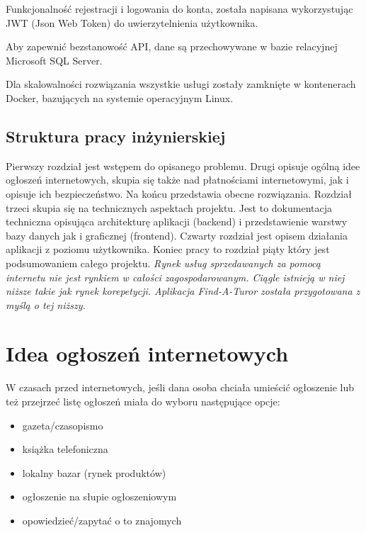 \documentclass[12pt]{article}
\numberwithin{figure}{section}
\begin{document}
Funkcjonalność rejestracji i logowania do konta, została napisana wykorzystując JWT (Json Web Token) do uwierzytelnienia użytkownika.

Aby zapewnić bezstanowość API, dane są przechowywane w bazie relacyjnej Microsoft SQL Server.

Dla skalowalności rozwiązania wszystkie usługi zostały zamknięte w kontenerach Docker, bazujących na systemie operacyjnym Linux.

\subsection{Struktura pracy inżynierskiej}
Pierwszy rozdział jest wstępem do opisanego problemu. Drugi opisuje ogólną idee ogłoszeń internetowych, skupia się także nad płatnościami internetowymi, jak i opisuje ich bezpieczeństwo. Na końcu przedstawia obecne rozwiązania. Rozdział trzeci skupia się na technicznych aspektach projektu. Jest to dokumentacja techniczna opisująca architekturę aplikacji (backend) i przedstawienie warstwy bazy danych jak i graficznej (frontend). Czwarty rozdział jest opisem działania aplikacji z poziomu użytkownika. Koniec pracy to rozdział piąty który jest podsumowaniem całego projektu.
\newline
\newline
\textit{Rynek usług sprzedawanych za pomocą internetu nie jest rynkiem w całości zagospodarowanym. Ciągle istnieją w niej niższe takie jak rynek korepetycji. Aplikacja Find-A-Turor została przygotowana z myślą o tej niższy.}
\section{Idea ogłoszeń internetowych}
W czasach przed internetowych, jeśli dana osoba chciała umieścić ogłoszenie lub też przejrzeć listę ogłoszeń miała do wyboru następujące opcje:
\begin{itemize}
    \item gazeta/czasopismo
    \item książka telefoniczna
    \item lokalny bazar (rynek produktów)
    \item ogłoszenie na słupie ogłoszeniowym
    \item opowiedzieć/zapytać o to znajomych
\end{itemize}
\end{document}
